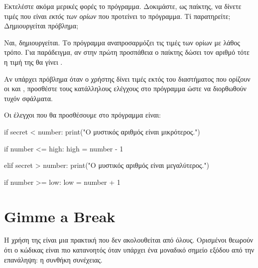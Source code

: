 \documentclass[a4paper,11pt,oneside]{book}
\begin{document}
\begin{step}
Εκτελέστε ακόμα μερικές φορές το πρόγραμμα. Δοκιμάστε, ως παίκτης, να δίνετε τιμές που είναι \emph{εκτός των ορίων} που προτείνει το πρόγραμμα. Τί παρατηρείτε; Δημιουργείται πρόβλημα;

\begin{answer}
	Ναι, δημιουργείται. Το πρόγραμμα αναπροσαρμόζει τις τιμές των ορίων με λάθος τρόπο. Για παράδειγμα, αν στην πρώτη προσπάθεια ο παίκτης δώσει τον αριθμό  τότε η τιμή της  θα γίνει .
\end{answer}

Αν υπάρχει πρόβλημα όταν ο χρήστης δίνει τιμές εκτός του διαστήματος που ορίζουν οι  και , προσθέστε τους κατάλληλους ελέγχους στο πρόγραμμα ώστε να διορθωθούν τυχόν σφάλματα.
\begin{answer}
	Οι έλεγχοι που θα προσθέσουμε στο πρόγραμμα είναι:
	
\begin{pyplain}	
if secret < number:
    print("Ο μυστικός αριθμός είναι μικρότερος.")	   
\end{pyplain}
\begin{pynew}
    if number <= high:
        high = number - 1    
\end{pynew}
\begin{pyplain}
elif secret > number:
    print("Ο μυστικός αριθμός είναι μεγαλύτερος.") 	    
\end{pyplain}
\begin{pynew}
    if number >= low:
        low = number + 1
\end{pynew}
\end{answer}
\end{step}

\section{Gimme a Break}
Η χρήση της  είναι μια πρακτική που δεν ακολουθείται από όλους. Ορισμένοι θεωρούν ότι ο κώδικας είναι πιο κατανοητός όταν υπάρχει ένα μοναδικό σημείο εξόδου από την επανάληψη: η συνθήκη συνέχειας.
\end{document}

